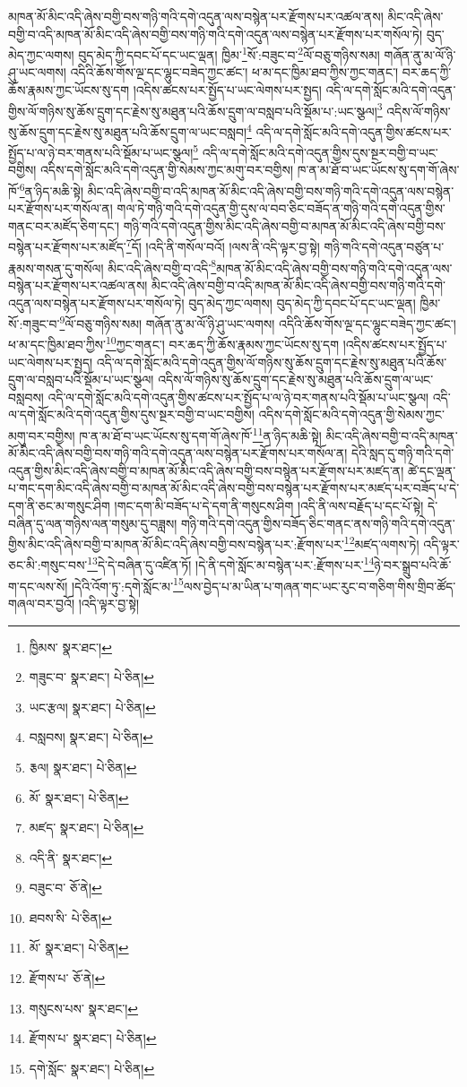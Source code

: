 མཁན་མོ་མིང་འདི་ཞེས་བགྱི་བས་གཉི་གའི་དགེ་འདུན་ལས་བསྙེན་པར་རྫོགས་པར་འཚལ་ནས། མིང་འདི་ཞེས་བགྱི་བ་འདི་མཁན་མོ་མིང་འདི་ཞེས་བགྱི་བས་གཉི་གའི་དགེ་འདུན་ལས་བསྙེན་པར་རྫོགས་པར་གསོལ་ཏེ། བུད་མེད་ཀྱང་ལགས། བུད་མེད་ཀྱི་དབང་པོ་དང་ཡང་ལྡན། ཁྱིམ་\footnote{ཁྱིམས་  སྣར་ཐང་། }སོ་:བཟུང་བ་\footnote{གཟུང་བ་  སྣར་ཐང་།  པེ་ཅིན། }ལོ་བཅུ་གཉིས་སམ། གཞོན་ནུ་མ་ལོ་ཉི་ཤུ་ཡང་ལགས། འདིའི་ཆོས་གོས་ལྔ་དང་ལྷུང་བཟེད་ཀྱང་ཚང་། ཕ་མ་དང་ཁྱིམ་ཐབ་ཀྱིས་ཀྱང་གནང་། བར་ཆད་ཀྱི་ཆོས་རྣམས་ཀྱང་ཡོངས་སུ་དག །འདིས་ཚངས་པར་སྤྱོད་པ་ཡང་ལེགས་པར་སྤྱད། འདི་ལ་དགེ་སློང་མའི་དགེ་འདུན་གྱིས་ལོ་གཉིས་སུ་ཆོས་དྲུག་དང་རྗེས་སུ་མཐུན་པའི་ཆོས་དྲུག་ལ་བསླབ་པའི་སྡོམ་པ་:ཡང་སྩལ།\footnote{ཡང་རྩལ།  སྣར་ཐང་།  པེ་ཅིན། } འདིས་ལོ་གཉིས་སུ་ཆོས་དྲུག་དང་རྗེས་སུ་མཐུན་པའི་ཆོས་དྲུག་ལ་ཡང་བསླབ།\footnote{བསླབས།  སྣར་ཐང་།  པེ་ཅིན། } འདི་ལ་དགེ་སློང་མའི་དགེ་འདུན་གྱིས་ཚངས་པར་སྤྱོད་པ་ལ་ཉེ་བར་གནས་པའི་སྡོམ་པ་ཡང་སྩལ།\footnote{རྕལ།  སྣར་ཐང་།  པེ་ཅིན། } འདི་ལ་དགེ་སློང་མའི་དགེ་འདུན་གྱིས་དུས་སྔར་བགྱི་བ་ཡང་བགྱིས། འདིས་དགེ་སློང་མའི་དགེ་འདུན་གྱི་སེམས་ཀྱང་མགུ་བར་བགྱིས། ཁ་ན་མ་ཐོ་བ་ཡང་ཡོངས་སུ་དག་གོ་ཞེས་ཁོ་\footnote{མོ་  སྣར་ཐང་།  པེ་ཅིན། }ན་ཉིད་མཆི་སྟེ། མིང་འདི་ཞེས་བགྱི་བ་འདི་མཁན་མོ་མིང་འདི་ཞེས་བགྱི་བས་གཉི་གའི་དགེ་འདུན་ལས་བསྙེན་པར་རྫོགས་པར་གསོལ་ན། གལ་ཏེ་གཉི་གའི་དགེ་འདུན་གྱི་དུས་ལ་བབ་ཅིང་བཟོད་ན་གཉི་གའི་དགེ་འདུན་གྱིས་གནང་བར་མཛོད་ཅིག་དང་། གཉི་གའི་དགེ་འདུན་གྱིས་མིང་འདི་ཞེས་བགྱི་བ་མཁན་མོ་མིང་འདི་ཞེས་བགྱི་བས་བསྙེན་པར་རྫོགས་པར་མཛོད་\footnote{མཛད་  སྣར་ཐང་།  པེ་ཅིན། }དོ། །འདི་ནི་གསོལ་བའོ། །ལས་ནི་འདི་ལྟར་བྱ་སྟེ། གཉི་གའི་དགེ་འདུན་བཙུན་པ་རྣམས་གསན་དུ་གསོལ། མིང་འདི་ཞེས་བགྱི་བ་འདི་\footnote{འདི་ནི་  སྣར་ཐང་། }མཁན་མོ་མིང་འདི་ཞེས་བགྱི་བས་གཉི་གའི་དགེ་འདུན་ལས་བསྙེན་པར་རྫོགས་པར་འཚལ་ནས། མིང་འདི་ཞེས་བགྱི་བ་འདི་མཁན་མོ་མིང་འདི་ཞེས་བགྱི་བས་གཉི་གའི་དགེ་འདུན་ལས་བསྙེན་པར་རྫོགས་པར་གསོལ་ཏེ། བུད་མེད་ཀྱང་ལགས། བུད་མེད་ཀྱི་དབང་པོ་དང་ཡང་ལྡན། ཁྱིམ་སོ་:གཟུང་བ་\footnote{བཟུང་བ་  ཅོ་ནེ། }ལོ་བཅུ་གཉིས་སམ། གཞོན་ནུ་མ་ལོ་ཉི་ཤུ་ཡང་ལགས། འདིའི་ཆོས་གོས་ལྔ་དང་ལྷུང་བཟེད་ཀྱང་ཚང་། ཕ་མ་དང་ཁྱིམ་ཐབ་ཀྱིས་\footnote{ཐབས་ིས་  པེ་ཅིན། }ཀྱང་གནང་། བར་ཆད་ཀྱི་ཆོས་རྣམས་ཀྱང་ཡོངས་སུ་དག །འདིས་ཚངས་པར་སྤྱོད་པ་ཡང་ལེགས་པར་སྤྱད། འདི་ལ་དགེ་སློང་མའི་དགེ་འདུན་གྱིས་ལོ་གཉིས་སུ་ཆོས་དྲུག་དང་རྗེས་སུ་མཐུན་པའི་ཆོས་དྲུག་ལ་བསླབ་པའི་སྡོམ་པ་ཡང་སྩལ། འདིས་ལོ་གཉིས་སུ་ཆོས་དྲུག་དང་རྗེས་སུ་མཐུན་པའི་ཆོས་དྲུག་ལ་ཡང་བསླབས། འདི་ལ་དགེ་སློང་མའི་དགེ་འདུན་གྱིས་ཚངས་པར་སྤྱོད་པ་ལ་ཉེ་བར་གནས་པའི་སྡོམ་པ་ཡང་སྩལ། འདི་ལ་དགེ་སློང་མའི་དགེ་འདུན་གྱིས་དུས་སྔར་བགྱི་བ་ཡང་བགྱིས། འདིས་དགེ་སློང་མའི་དགེ་འདུན་གྱི་སེམས་ཀྱང་མགུ་བར་བགྱིས། ཁ་ན་མ་ཐོ་བ་ཡང་ཡོངས་སུ་དག་གོ་ཞེས་ཁོ་\footnote{མོ་  སྣར་ཐང་།  པེ་ཅིན། }ན་ཉིད་མཆི་སྟེ། མིང་འདི་ཞེས་བགྱི་བ་འདི་མཁན་མོ་མིང་འདི་ཞེས་བགྱི་བས་གཉི་གའི་དགེ་འདུན་ལས་བསྙེན་པར་རྫོགས་པར་གསོལ་ན། དེའི་སླད་དུ་གཉི་གའི་དགེ་འདུན་གྱིས་མིང་འདི་ཞེས་བགྱི་བ་མཁན་མོ་མིང་འདི་ཞེས་བགྱི་བས་བསྙེན་པར་རྫོགས་པར་མཛད་ན། ཚེ་དང་ལྡན་པ་གང་དག་མིང་འདི་ཞེས་བགྱི་བ་མཁན་མོ་མིང་འདི་ཞེས་བགྱི་བས་བསྙེན་པར་རྫོགས་པར་མཛད་པར་བཟོད་པ་དེ་དག་ནི་ཅང་མ་གསུང་ཤིག །གང་དག་མི་བཟོད་པ་དེ་དག་ནི་གསུངས་ཤིག །འདི་ནི་ལས་བརྗོད་པ་དང་པོ་སྟེ། དེ་བཞིན་དུ་ལན་གཉིས་ལན་གསུམ་དུ་བཟླས། གཉི་གའི་དགེ་འདུན་གྱིས་བཟོད་ཅིང་གནང་ནས་གཉི་གའི་དགེ་འདུན་གྱིས་མིང་འདི་ཞེས་བགྱི་བ་མཁན་མོ་མིང་འདི་ཞེས་བགྱི་བས་བསྙེན་པར་:རྫོགས་པར་\footnote{རྫོགས་པ་  ཅོ་ནེ། }མཛད་ལགས་ཏེ། འདི་ལྟར་ཅང་མི་:གསུང་བས་\footnote{གསུངས་པས་  སྣར་ཐང་། }དེ་དེ་བཞིན་དུ་འཛིན་ཏོ། །དེ་ནི་དགེ་སློང་མ་བསྙེན་པར་:རྫོགས་པར་\footnote{རྫོགས་པ་  སྣར་ཐང་།  པེ་ཅིན། }ཉེ་བར་སྒྲུབ་པའི་ཆོ་ག་དང་ལས་སོ། །དེའི་འོག་ཏུ་:དགེ་སློང་མ་\footnote{དགེ་སློང་  སྣར་ཐང་།  པེ་ཅིན། }ལས་བྱེད་པ་མ་ཡིན་པ་གཞན་གང་ཡང་རུང་བ་གཅིག་གིས་གྲིབ་ཚོད་གཞལ་བར་བྱའོ། །འདི་ལྟར་བྱ་སྟེ། 